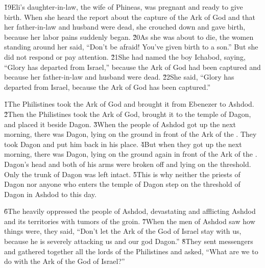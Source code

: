 \v{19}Eli's daughter-in-law, the wife of Phineas, was pregnant and ready to give birth. When she heard the report about the capture of the Ark of God and that her father-in-law and husband were dead, she crouched down and gave birth, because her labor pains suddenly began. \v{20}As she was about to die, the women standing around her said, ``Don't be afraid! You've given birth to a son.'' But she did not respond or pay attention. \v{21}She had named the boy Ichabod, saying, ``Glory has departed from Israel,'' because the Ark of God had been captured and because her father-in-law and husband were dead. \v{22}She said, ``Glory has departed from Israel, because the Ark of God has been captured.''

\v{1}The Philistines took the Ark of God and brought it from Ebenezer to Ashdod. \v{2}Then the Philistines took the Ark of God, brought it to the temple of Dagon, and placed it beside Dagon. \v{3}When the people of Ashdod got up the next morning, there was Dagon, lying on the ground in front of the Ark of the . They took Dagon and put him back in his place. \v{4}But when they got up the next morning, there was Dagon, lying on the ground again in front of the Ark of the . Dagon's head and both of his arms were broken off and lying on the threshold. Only the trunk of Dagon was left intact. \v{5}This is why neither the priests of Dagon nor anyone who enters the temple of Dagon step on the threshold of Dagon in Ashdod to this day.

\v{6}The  heavily oppressed the people of Ashdod, devastating and afflicting Ashdod and its territories with tumors of the groin. \v{7}When the men of Ashdod saw how things were, they said, ``Don't let the Ark of the God of Israel stay with us, because he is severely attacking us and our god Dagon.'' \v{8}They sent messengers and gathered together all the lords of the Philistines and asked, ``What are we to do with the Ark of the God of Israel?''

